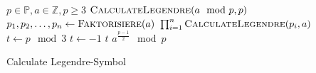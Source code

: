 \documentclass{article}
\newcommand{\tikzmark}[1]{\tikz[overlay,remember picture] \node (#1) {};}
\newcommand*{\AddNote}[4]{%
    \begin{tikzpicture}[overlay, remember picture]
        \draw [decoration={brace,amplitude=0.5em},decorate,very thick]
            ($(#3)!(#1.north)!($(#3)-(0,1)$)$) --  
            ($(#3)!(#2.south)!($(#3)-(0,1)$)$)
                node [align=center, text width=2.5cm, pos=0.5, anchor=west] {#4};
    \end{tikzpicture}
}%
\begin{document}
\begin{preview}
    \begin{algorithm}[H]
        \begin{algorithmic}
            \Require $p \in \mathbb{P}, a \in \mathbb{Z}, p \geq 3$
				\State \Return $\Call{CalculateLegendre}{a \mod p, p}$ 
			 
				\State {}
			 
				\State {}
			 
					\State {}
				\Else
					\State {}
				\EndIf
			 
				\State $p_1, p_2, \dots, p_n \gets \Call{Faktorisiere}{a}$
				\State \Return $\prod_{i=1}^n \Call{CalculateLegendre}{p_i, a}$
			 
				\State $t \gets p \mod 3$
					\State $t \gets -1$
				\EndIf
				\State \Return $t$
			\Else
				\State \Return $a^\frac{p-1}{2} \mod p$
			\EndIf
        \end{algorithmic}
    \caption{Calculate Legendre-Symbol}
    \label{alg:euclidBaseTransformation}
    \end{algorithm}
\end{preview}
\end{document}
